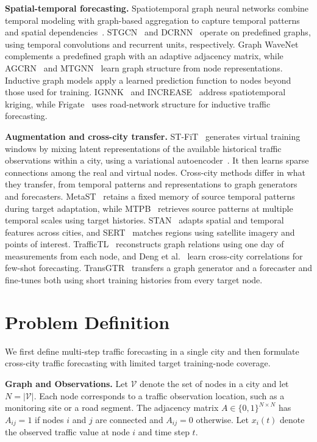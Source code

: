 \documentclass[runningheads,a4paper]{llncs}
\begin{document}
\noindent\textbf{Spatial-temporal forecasting.} Spatiotemporal graph neural networks combine temporal modeling with graph-based aggregation to capture temporal patterns and spatial dependencies~\cite{stsurvey}. STGCN~\cite{stgcn} and DCRNN~\cite{dcrnn} operate on predefined graphs, using temporal convolutions and recurrent units, respectively. Graph WaveNet~\cite{graphwavenet} complements a predefined graph with an adaptive adjacency matrix, while AGCRN~\cite{agcrn} and MTGNN~\cite{mtgnn} learn graph structure from node representations. Inductive graph models apply a learned prediction function to nodes beyond those used for training. IGNNK~\cite{ignnk} and INCREASE~\cite{increase} address spatiotemporal kriging, while Frigate~\cite{frigate} uses road-network structure for inductive traffic forecasting.

\noindent\textbf{Augmentation and cross-city transfer.}
ST-FiT~\cite{stfit} generates virtual training windows by mixing latent representations of the available historical traffic observations within a city, using a variational autoencoder~\cite{vae}. It then learns sparse connections among the real and virtual nodes.
Cross-city methods differ in what they transfer, from temporal patterns and representations to graph generators and forecasters. MetaST~\cite{metast} retains a fixed memory of source temporal patterns during target adaptation, while MTPB~\cite{mtpb} retrieves source patterns at multiple temporal scales using target histories. STAN~\cite{stan} adapts spatial and temporal features across cities, and SERT~\cite{sert} matches regions using satellite imagery and points of interest. TrafficTL~\cite{traffictl} reconstructs graph relations using one day of measurements from each node, and Deng et al.~\cite{crosscity} learn cross-city correlations for few-shot forecasting. TransGTR~\cite{transgtr} transfers a graph generator and a forecaster and fine-tunes both using short training histories from every target node.

\section{Problem Definition}\label{sec:problem}

We first define multi-step traffic forecasting in a single city and then formulate cross-city traffic forecasting with limited target training-node coverage.

\noindent\textbf{Graph and Observations.}
Let $\mathcal V$ denote the set of nodes in a city and let $N=|\mathcal V|$. Each node corresponds to a traffic observation location, such as a monitoring site or a road segment. The adjacency matrix $A\in\{0,1\}^{N\times N}$ has $A_{ij}=1$ if nodes $i$ and $j$ are connected and $A_{ij}=0$ otherwise. Let $x_i(t)$ denote the observed traffic value at node $i$ and time step $t$.
\end{document}
